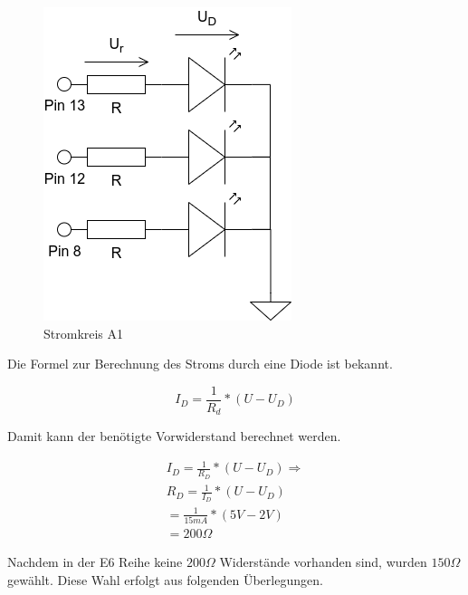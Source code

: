 \documentclass[11pt]{article}
\begin{document}
    \begin{figure}[h]
        \centering
        \includegraphics[height=0.4\textheight]{pictures/A1.png}
        \caption{Stromkreis A1}
        \label{fig:stromkreis-a1}
    \end{figure}

    Die Formel zur Berechnung des Stroms durch eine Diode ist bekannt.

    \begin{equation}
        I_D =  \frac{1}{R_d} * (U - U_D) \label{eq:diodenstrom}
    \end{equation}

    Damit kann der benötigte Vorwiderstand berechnet werden.

    \begin{equation}
        \begin{align}
            I_D =  \frac{1}{R_D} * (U - U_D) \Rightarrow \\
            R_D = \frac{1}{I_D} * (U - U_D) \\
            = \frac{1}{15mA} * (5V - 2V) \\
            = 200\Omega
        \end{align}
        \label{eq:equation-a1}
    \end{equation}

    Nachdem in der E6 Reihe keine $200\Omega$ Widerstände vorhanden sind, wurden $150\Omega$ gewählt.
    Diese Wahl erfolgt aus folgenden Überlegungen.
\end{document}
